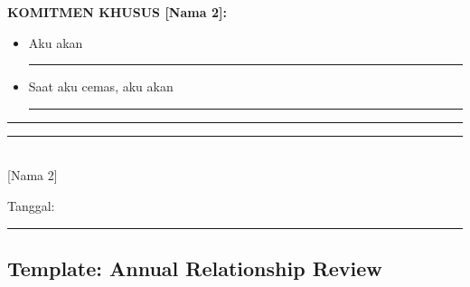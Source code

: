 \begin{exercisebox}
\textbf{KOMITMEN KHUSUS [Nama 2]:}
\begin{itemize}[itemsep=0.15cm]
    \item[$\square$] Aku akan \rule{10cm}{0.4pt}
    \item[$\square$] Saat aku cemas, aku akan \rule{8cm}{0.4pt}
\end{itemize}

\vspace{0.5cm}
\rule{6cm}{0.4pt} \hspace{1cm} \rule{6cm}{0.4pt}\\
[Nama 1] \hspace{4cm} [Nama 2]

\vspace{0.3cm}
Tanggal: \rule{3cm}{0.4pt}
\end{exercisebox}

\subsection{Template: Annual Relationship Review}

